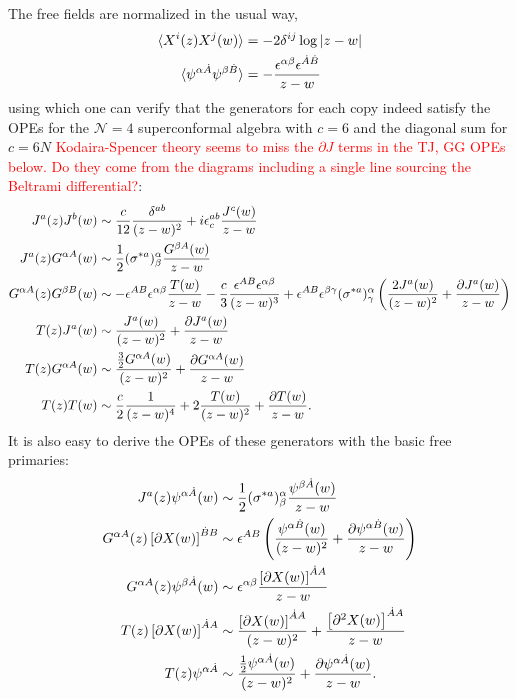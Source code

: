 \documentclass[11pt]{amsart}
\newcommand{\mc}{\mathcal}
\theoremstyle{thm}
\numberwithin{equation}{subsection}
\theoremstyle{def}
\theoremstyle{rem}
\begin{document}
The free fields are normalized in the usual way,
\begin{align*}
\langle X^i(z) X^j(w) \rangle &= -2 \delta^{ij}\log|z-w| \\
\langle \psi^{\alpha \dot{A}} \psi^{\beta \dot{B}} \rangle &= - {\epsilon^{\alpha \beta}\epsilon^{\dot{A}\dot{B}} \over z-w}
\end{align*}
using which one can verify that the generators for each copy indeed satisfy the OPEs for the $\mc N=4$ superconformal algebra with $c=6$ and the diagonal sum for $c=6N$ \textcolor{red}{Kodaira-Spencer theory seems to miss the $\partial J$ terms in the TJ, GG OPEs below. Do they come from the diagrams including a single line sourcing the Beltrami differential?}:
\begin{align*}
J^a(z)J^b(w) &\sim  {c \over 12}{\delta^{ab} \over (z-w)^2} + i \epsilon^{ab}_c {J^c(w) \over z-w}\\
J^a(z)G^{\alpha A}(w) &\sim {1 \over 2} (\sigma^{*a})^{\alpha}_{\beta} {G^{\beta A}(w) \over z-w}\\
G^{\alpha A}(z)G^{\beta B}(w) &\sim  - \epsilon^{AB}\epsilon^{\alpha \beta}{T(w) \over z-w} - {c \over 3}{\epsilon^{AB} \epsilon^{\alpha \beta} \over (z-w)^3} + \epsilon^{AB}\epsilon^{\beta\gamma}(\sigma^{*a})^{\alpha}_{\gamma}\left({2 J^a(w) \over (z-w)^2} + {\partial J^a(w) \over z-w} \right)\\
T(z)J^a(w) &\sim {J^a(w) \over (z-w)^2} + {\partial J^a(w) \over z-w}\\
T(z)G^{\alpha A}(w)&\sim { {3 \over 2} G^{\alpha A}(w) \over (z-w)^2} + {\partial G^{\alpha A}(w) \over z-w}\\
T(z)T(w) &\sim {c \over 2}{1 \over (z-w)^4} + 2 {T(w) \over (z-w)^2} + {\partial T(w) \over z-w}.
\end{align*}
It is also easy to derive the OPEs of these generators with the basic free primaries:
\begin{align*}
J^a(z)\psi^{\alpha \dot{A}}(w) &\sim {1 \over 2}(\sigma^{*a})^{\alpha}_{\beta}{\psi^{\beta \dot{A}}(w) \over z-w}\\
G^{\alpha A}(z)\left[\partial X(w)\right]^{\dot{B}B} &\sim \epsilon^{AB}\left({\psi^{\alpha \dot{B}}(w) \over (z-w)^2} + {\partial \psi^{\alpha \dot{B}}(w) \over z-w} \right)\\
G^{\alpha A}(z)\psi^{\beta \dot{A}}(w) &\sim \epsilon^{\alpha \beta}{\left[\partial X(w) \right]^{\dot{A}A} \over z-w}\\
T(z) \left[\partial X(w) \right]^{\dot{A}A} &\sim { \left[\partial X(w) \right]^{\dot{A}A} \over (z-w)^2} + {\left[\partial^2 X(w) \right]^{\dot{A}A} \over z-w}\\
T(z) \psi^{\alpha \dot{A}} &\sim {{1\over2} \psi^{\alpha \dot{A}}(w) \over (z-w)^2} + {\partial \psi^{\alpha \dot{A}}(w) \over z-w}.
\end{align*}
\end{document}
